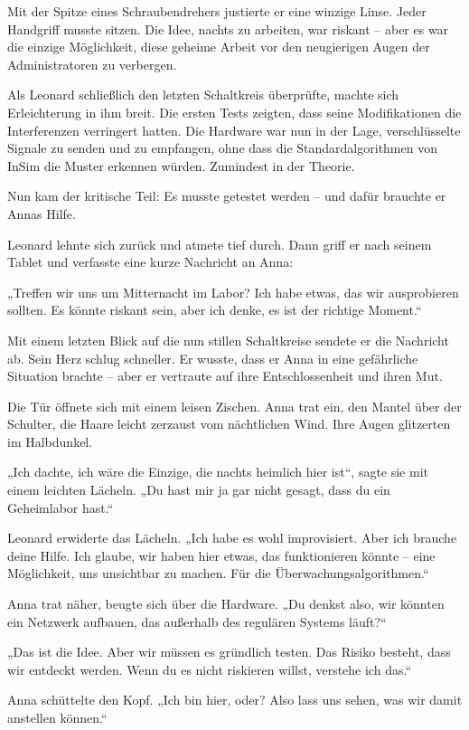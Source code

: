 \documentclass[
]{article}
\begin{document}
Mit der Spitze eines Schraubendrehers justierte er eine winzige Linse. Jeder Handgriff musste sitzen. Die Idee, nachts zu arbeiten, war riskant -- aber es war die einzige Möglichkeit, diese geheime Arbeit vor den neugierigen Augen der Administratoren zu verbergen.

Als Leonard schließlich den letzten Schaltkreis überprüfte, machte sich Erleichterung in ihm breit. Die ersten Tests zeigten, dass seine Modifikationen die Interferenzen verringert hatten. Die Hardware war nun in der Lage, verschlüsselte Signale zu senden und zu empfangen, ohne dass die Standardalgorithmen von InSim die Muster erkennen würden. Zumindest in der Theorie.

Nun kam der kritische Teil: Es musste getestet werden -- und dafür brauchte er Annas Hilfe.

Leonard lehnte sich zurück und atmete tief durch. Dann griff er nach seinem Tablet und verfasste eine kurze Nachricht an Anna:

„Treffen wir uns um Mitternacht im Labor? Ich habe etwas, das wir ausprobieren sollten. Es könnte riskant sein, aber ich denke, es ist der richtige Moment.``

Mit einem letzten Blick auf die nun stillen Schaltkreise sendete er die Nachricht ab. Sein Herz schlug schneller. Er wusste, dass er Anna in eine gefährliche Situation brachte -- aber er vertraute auf ihre Entschlossenheit und ihren Mut.

Die Tür öffnete sich mit einem leisen Zischen. Anna trat ein, den Mantel über der Schulter, die Haare leicht zerzaust vom nächtlichen Wind. Ihre Augen glitzerten im Halbdunkel.

„Ich dachte, ich wäre die Einzige, die nachts heimlich hier ist``, sagte sie mit einem leichten Lächeln. „Du hast mir ja gar nicht gesagt, dass du ein Geheimlabor hast.``

Leonard erwiderte das Lächeln. „Ich habe es wohl improvisiert. Aber ich brauche deine Hilfe. Ich glaube, wir haben hier etwas, das funktionieren könnte -- eine Möglichkeit, uns unsichtbar zu machen. Für die Überwachungsalgorithmen.``

Anna trat näher, beugte sich über die Hardware. „Du denkst also, wir könnten ein Netzwerk aufbauen, das außerhalb des regulären Systems läuft?{\kern0pt}``

„Das ist die Idee. Aber wir müssen es gründlich testen. Das Risiko besteht, dass wir entdeckt werden. Wenn du es nicht riskieren willst, verstehe ich das.``

Anna schüttelte den Kopf. „Ich bin hier, oder? Also lass uns sehen, was wir damit anstellen können.``
\end{document}
